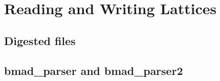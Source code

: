 \chapter{Reading and Writing Lattices}
\section{Digested files}
\section{bmad\_parser and bmad\_parser2}
